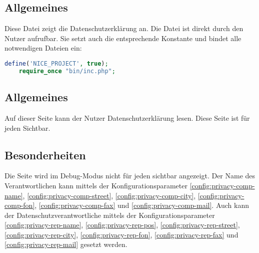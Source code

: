 \subsection{Allgemeines} Diese Datei zeigt die Datenschutzerklärung an.
Die Datei ist direkt durch den Nutzer aufrufbar. Sie setzt auch die entsprechende Konstante und bindet alle notwendigen Dateien ein:
\begin{lstlisting}[language=php]
	define('NICE_PROJECT', true);
	require_once "bin/inc.php";
\end{lstlisting}
\subsection{Allgemeines}
Auf dieser Seite kann der Nutzer Datenschutzerklärung lesen. Diese Seite ist für jeden Sichtbar.
\subsection{Besonderheiten}
Die Seite wird im Debug-Modus nicht für jeden sichtbar angezeigt. Der Name des Verantwortlichen kann mittels der Konfigurationsparameter \autoref{config:privacy-comp-name}, \autoref{config:privacy-comp-street}, \autoref{config:privacy-comp-city}, \autoref{config:privacy-comp-fon}, \autoref{config:privacy-comp-fax} und \autoref{config:privacy-comp-mail}. Auch kann der Datenschutzverantwortliche mittels der Konfigurationsparameter \autoref{config:privacy-rep-name}, \autoref{config:privacy-rep-pos}, \autoref{config:privacy-rep-street}, \autoref{config:privacy-rep-city}, \autoref{config:privacy-rep-fon}, \autoref{config:privacy-rep-fax} und \autoref{config:privacy-rep-mail} gesetzt werden.